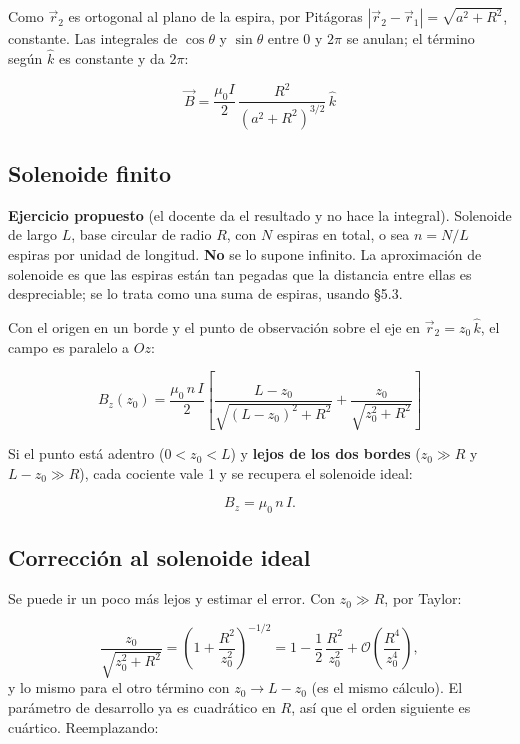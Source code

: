\documentclass[12pt,a4paper]{article}
\begin{document}
Como $\vec r_2$ es ortogonal al plano de la espira, por Pitágoras
$|\vec r_2-\vec r_1| = \sqrt{a^2+R^2}$, constante. Las integrales de
$\cos\theta$ y $\sin\theta$ entre $0$ y $2\pi$ se anulan; el término según
$\hat k$ es constante y da $2\pi$:

\begin{keybox}
\[
\boxed{\ \vec B = \frac{\mu_0 I}{2}\,\frac{R^2}{\left(a^2+R^2\right)^{3/2}}\,\hat k\ }
\]
\end{keybox}

\subsection{Solenoide finito}

\textbf{Ejercicio propuesto} (el docente da el resultado y no hace la integral).
Solenoide de largo $L$, base circular de radio $R$, con $N$ espiras en total, o
sea $n = N/L$ espiras por unidad de longitud. \textbf{No} se lo supone infinito. La
aproximación de solenoide es que las espiras están tan pegadas que la distancia
entre ellas es despreciable; se lo trata como una suma de espiras, usando §5.3.

Con el origen en un borde y el punto de observación sobre el eje en
$\vec r_2 = z_0\,\hat k$, el campo es paralelo a $Oz$:

\begin{keybox}
\[
\boxed{\ B_z(z_0) = \frac{\mu_0\,n\,I}{2}\left[
\frac{L-z_0}{\sqrt{(L-z_0)^2+R^2}} + \frac{z_0}{\sqrt{z_0^2+R^2}}\right]\ }
\]
\end{keybox}

Si el punto está adentro ($0<z_0<L$) y \textbf{lejos de los dos bordes}
($z_0\gg R$ y $L-z_0\gg R$), cada cociente vale 1 y se recupera el solenoide
ideal:

\[
B_z = \mu_0\,n\,I .
\]

\subsection{Corrección al solenoide ideal}

Se puede ir un poco más lejos y estimar el error. Con $z_0\gg R$, por Taylor:

\[
\frac{z_0}{\sqrt{z_0^2+R^2}} = \left(1+\frac{R^2}{z_0^2}\right)^{-1/2}
= 1 - \frac12\,\frac{R^2}{z_0^2} + \mathcal O\!\left(\frac{R^4}{z_0^4}\right),
\]
y lo mismo para el otro término con $z_0\to L-z_0$ (es el mismo cálculo). El
parámetro de desarrollo ya es cuadrático en $R$, así que el orden siguiente es
cuártico. Reemplazando:
\end{document}
